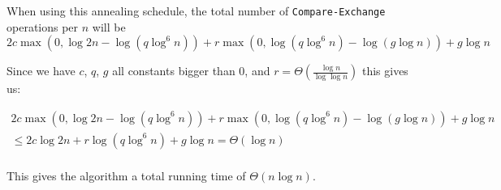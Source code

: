 When using this annealing schedule, the total number of \texttt{Compare-Exchange} operations per $n$ will be 
\[
2c \max(0, \log 2n - \log (q \log^6 n)) + r \max(0,\log (q \log^6 n) - \log (g \log n)) + g \log n
\]

Since we have $c$, $q$, $g$ all constants bigger than 0, and $r=\Theta(\frac{\log n}{\log \log n})$ this gives us:

\begin{multline*}
2c \max(0, \log 2n - \log (q \log^6 n)) + r \max(0,\log (q \log^6 n) - \log (g \log n)) + g \log n
\\
\le 2c \log 2n  + r \log (q \log^6 n) + g \log n
=
\Theta(\log n)\\
\end{multline*}

This gives the algorithm a total running time of $\Theta(n \log n)$.
